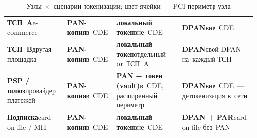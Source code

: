 \begin{table}[tbp]
  \caption{Узлы~$\times$~сценарии токенизации; цвет ячейки~--- PCI-периметр узла}\label{tab:token-risk-before-after}
  \begingroup
  \tablesetup
  \begin{minipage}{\textwidth}
    \begin{tabularx}{\textwidth}{@{}P{0.19\textwidth} Y Y Y@{}}
      \toprule
      \headrow
       &  &  &
       \\
      \midrule
      \textbf{ТСП~A}\newline e-commerce &
      \textbf{PAN-копия}\newline в~CDE &
      \textbf{локальный токен}\newline вне~CDE &
      \textbf{DPAN}\newline вне~CDE \\
      \rowsep
      \textbf{ТСП~B}\newline другая площадка &
      \textbf{PAN-копия}\newline в~CDE &
      \textbf{локальный токен}\newline отдельный от~ТСП~A &
      \textbf{DPAN}\newline свой DPAN на~каждый ТСП \\
      \rowsep
      \textbf{PSP / шлюз}\newline провайдер платежей &
      \textbf{PAN-копия}\newline в~CDE &
      \textbf{PAN + токен (vault)}\newline в~CDE, расширенный периметр &
      \textbf{DPAN}\newline вне~CDE~--- детокенизация в~сети \\
      \rowsep
      \textbf{Подписка}\newline card-on-file / MIT &
      \textbf{PAN-копия}\newline в~CDE &
      \textbf{локальный токен}\newline вне~CDE &
      \textbf{DPAN + PAR}\newline card-on-file без~PAN \\
      \bottomrule
    \end{tabularx}
    \par\smallskip
  \end{minipage}\par
  \endgroup
\end{table}

